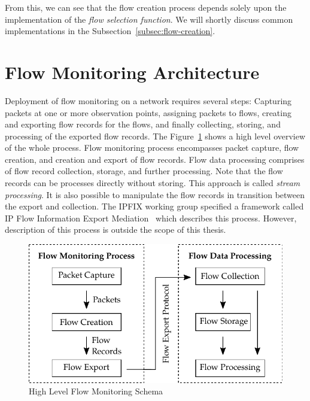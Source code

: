 From this, we can see that the flow creation process depends solely upon the implementation of the \emph{flow selection function}. We will shortly discuss common implementations in the Subsection~\ref{subsec:flow-creation}.

\section{Flow Monitoring Architecture}\label{sec:flow-monitoring-architecture}

Deployment of flow monitoring on a network requires several steps: Capturing packets at one or more observation points, assigning packets to flows, creating and exporting flow records for the flows, and finally collecting, storing, and processing of the exported flow records. 
The Figure~\ref{fig:flow-monitoring-process} shows a high level overview of the whole process. Flow monitoring process encompasses packet capture, flow creation, and creation and export of flow records. Flow data processing comprises of flow record collection, storage, and further processing. Note that the flow records can be processes directly without storing. This approach is called \emph{stream processing}. It is also possible to manipulate the flow records in transition between the export and collection. The IPFIX working group specified a framework called IP Flow Information Export Mediation~\cite{rfc6183} which describes this process. However, description of this process is outside the scope of this thesis.

\begin{figure}[t!]
  \begin{center}
    \includegraphics{figures/flow-monitoring-process}
  \end{center}
  \caption{High Level Flow Monitoring Schema}
  \label{fig:flow-monitoring-process}
\end{figure}

